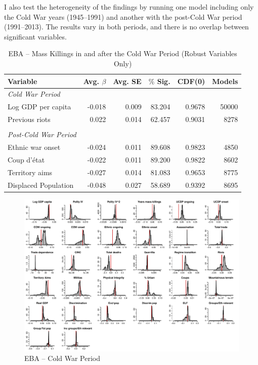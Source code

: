 I also test the heterogeneity of the findings by running one model including only the Cold War years (1945--1991) and another with the post-Cold War period (1991--2013). The results vary in both periods, and there is no overlap between significant variables.

\vspace{.5cm}

\begin{table}[H]
\centering
\begin{tabular}{lrrrrr}
\hline
\textbf{Variable} & \textbf{Avg. $\beta$} & \textbf{Avg. SE} & \textbf{$\%$ Sig.} & \textbf{CDF(0)} & \textbf{Models} \\ \hline
\textit{Cold War Period} &  &  &  &  &  \\
Log GDP per capita & -0.018 & 0.009 & 83.204 & 0.9678 & 50000 \\
Previous riots & 0.022 & 0.014 & 62.457 & 0.9031 & 8278 \\
 &  &  &  &  &  \\
\textit{Post-Cold War Period} &  &  &  &  &  \\
Ethnic war onset & -0.024 & 0.011 & 89.608 & 0.9823 & 4850 \\
Coup d'état & -0.022 & 0.011 & 89.200 & 0.9822 & 8602 \\ 
Territory aims & -0.027 & 0.014 & 81.083 & 0.9653 & 8775 \\ 
Displaced Population & -0.048 & 0.027 & 58.689 & 0.9392 & 8695 \\ \hline
\end{tabular}
\caption{EBA -- Mass Killings in and after the Cold War Period (Robust Variables Only)}
\label{tab:coldwar2}
\end{table}

\clearpage
\begin{figure}
    \centering
    \includegraphics[width=.9\textwidth]{images/mk-coldwar.pdf}
    \caption{EBA -- Cold War Period}
    \label{fig:mk-coldwar}
\end{figure}
\clearpage

